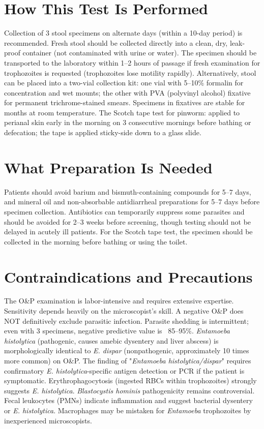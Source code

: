 \section*{How This Test Is Performed}
Collection of 3 stool specimens on alternate days (within a 10-day period) is recommended. Fresh stool should be collected directly into a clean, dry, leak-proof container (not contaminated with urine or water). The specimen should be transported to the laboratory within 1--2 hours of passage if fresh examination for trophozoites is requested (trophozoites lose motility rapidly). Alternatively, stool can be placed into a two-vial collection kit: one vial with 5--10\% formalin for concentration and wet mounts; the other with PVA (polyvinyl alcohol) fixative for permanent trichrome-stained smears. Specimens in fixatives are stable for months at room temperature. The Scotch tape test for pinworm: applied to perianal skin early in the morning on 3 consecutive mornings before bathing or defecation; the tape is applied sticky-side down to a glass slide.

\section*{What Preparation Is Needed}
Patients should avoid barium and bismuth-containing compounds for 5--7 days, and mineral oil and non-absorbable antidiarrheal preparations for 5--7 days before specimen collection. Antibiotics can temporarily suppress some parasites and should be avoided for 2--3 weeks before screening, though testing should not be delayed in acutely ill patients. For the Scotch tape test, the specimen should be collected in the morning before bathing or using the toilet.

\section*{Contraindications and Precautions}
The O\&P examination is labor-intensive and requires extensive expertise. Sensitivity depends heavily on the microscopist's skill. A negative O\&P does NOT definitively exclude parasitic infection. Parasite shedding is intermittent; even with 3 specimens, negative predictive value is ~85--95\%. \textit{Entamoeba histolytica} (pathogenic, causes amebic dysentery and liver abscess) is morphologically identical to \textit{E. dispar} (nonpathogenic, approximately 10 times more common) on O\&P. The finding of "\textit{Entamoeba histolytica/dispar}" requires confirmatory \textit{E. histolytica}-specific antigen detection or PCR if the patient is symptomatic. Erythrophagocytosis (ingested RBCs within trophozoites) strongly suggests \textit{E. histolytica}. \textit{Blastocystis hominis} pathogenicity remains controversial. Fecal leukocytes (PMNs) indicate inflammation and suggest bacterial dysentery or \textit{E. histolytica}. Macrophages may be mistaken for \textit{Entamoeba} trophozoites by inexperienced microscopists.

